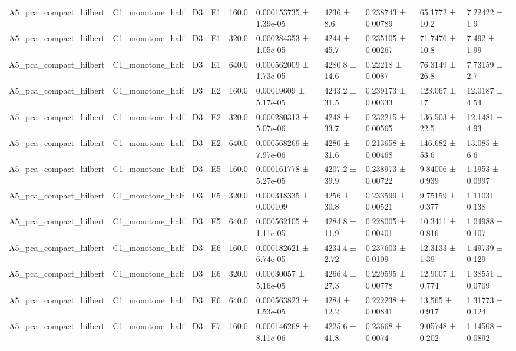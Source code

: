 \begin{table}
\begin{tabular}{llllllllll}
A5\_pca\_compact\_hilbert & C1\_monotone\_half & D3 & E1 & 160.0 & 0.000153735 ± 1.39e-05 & 4236 ± 8.6 & 0.238743 ± 0.00789 & 65.1772 ± 10.2 & 7.22422 ± 1.9 \\
A5\_pca\_compact\_hilbert & C1\_monotone\_half & D3 & E1 & 320.0 & 0.000284353 ± 1.05e-05 & 4244 ± 45.7 & 0.235105 ± 0.00267 & 71.7476 ± 10.8 & 7.492 ± 1.99 \\
A5\_pca\_compact\_hilbert & C1\_monotone\_half & D3 & E1 & 640.0 & 0.000562009 ± 1.73e-05 & 4280.8 ± 14.6 & 0.22218 ± 0.0087 & 76.3149 ± 26.8 & 7.73159 ± 2.7 \\
A5\_pca\_compact\_hilbert & C1\_monotone\_half & D3 & E2 & 160.0 & 0.00019609 ± 5.17e-05 & 4243.2 ± 31.5 & 0.239173 ± 0.00333 & 123.067 ± 17 & 12.0187 ± 4.54 \\
A5\_pca\_compact\_hilbert & C1\_monotone\_half & D3 & E2 & 320.0 & 0.000280313 ± 5.07e-06 & 4248 ± 33.7 & 0.232215 ± 0.00565 & 136.503 ± 22.5 & 12.1481 ± 4.93 \\
A5\_pca\_compact\_hilbert & C1\_monotone\_half & D3 & E2 & 640.0 & 0.000568269 ± 7.97e-06 & 4280 ± 31.6 & 0.213658 ± 0.00468 & 146.682 ± 53.6 & 13.085 ± 6.6 \\
A5\_pca\_compact\_hilbert & C1\_monotone\_half & D3 & E5 & 160.0 & 0.000161778 ± 5.27e-05 & 4207.2 ± 39.9 & 0.238973 ± 0.00722 & 9.84006 ± 0.939 & 1.1953 ± 0.0997 \\
A5\_pca\_compact\_hilbert & C1\_monotone\_half & D3 & E5 & 320.0 & 0.000318335 ± 0.000109 & 4256 ± 30.8 & 0.233599 ± 0.00521 & 9.75159 ± 0.377 & 1.11031 ± 0.138 \\
A5\_pca\_compact\_hilbert & C1\_monotone\_half & D3 & E5 & 640.0 & 0.000562105 ± 1.11e-05 & 4284.8 ± 11.9 & 0.228005 ± 0.00401 & 10.3411 ± 0.816 & 1.04988 ± 0.107 \\
A5\_pca\_compact\_hilbert & C1\_monotone\_half & D3 & E6 & 160.0 & 0.000182621 ± 6.74e-05 & 4234.4 ± 2.72 & 0.237603 ± 0.0109 & 12.3133 ± 1.39 & 1.49739 ± 0.129 \\
A5\_pca\_compact\_hilbert & C1\_monotone\_half & D3 & E6 & 320.0 & 0.00030057 ± 5.16e-05 & 4266.4 ± 27.3 & 0.229595 ± 0.00778 & 12.9007 ± 0.774 & 1.38551 ± 0.0709 \\
A5\_pca\_compact\_hilbert & C1\_monotone\_half & D3 & E6 & 640.0 & 0.000563823 ± 1.53e-05 & 4284 ± 12.2 & 0.222238 ± 0.00841 & 13.565 ± 0.917 & 1.31773 ± 0.124 \\
A5\_pca\_compact\_hilbert & C1\_monotone\_half & D3 & E7 & 160.0 & 0.000146268 ± 8.11e-06 & 4225.6 ± 41.8 & 0.23668 ± 0.0074 & 9.05748 ± 0.202 & 1.14508 ± 0.0892 \\

\end{tabular}
\end{table}
